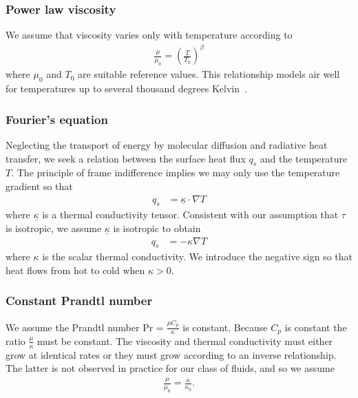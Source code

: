 \documentclass[letterpaper,11pt,nointlimits,reqno]{amsart}
\newcommand{\Prandtl}[1][]{\ensuremath{\mbox{Pr}_{#1}}}
\begin{document}
\subsubsection{Power law viscosity}

We assume that viscosity varies only with temperature according to
\begin{align}
\label{eq:powerlawviscosity}
\frac{\mu}{\mu_{0}}=\left(\frac{T}{T_{0}}\right)^{\beta}
\end{align}
where $\mu_{0}$ and $T_{0}$ are suitable reference values.  This
relationship models air well for temperatures up to several thousand
degrees Kelvin~\cite{NASA-TR-R-132}.

\subsubsection{Fourier's equation}

Neglecting the transport of energy by molecular diffusion and radiative
heat transfer, we seek a relation between the surface heat flux $q_{s}$
and the temperature $T$.  The principle of frame indifference implies
we may only use the temperature gradient so that
\begin{align}
  \label{eq:fouriertensorlaw}
  q_{s} &= \underline{\kappa} \cdot \nabla{} T
\end{align}
where $\underline{\kappa}$ is a thermal conductivity tensor.
Consistent with our assumption that $\tau$ is isotropic, we assume
$\underline{\kappa}$ is isotropic to obtain
\begin{align}
  \label{eq:fourierlaw}
  q_{s} &= - \kappa \nabla{} T
\end{align}
where $\kappa$ is the scalar thermal conductivity.  We introduce the
negative sign so that heat flows from hot to cold when $\kappa>0$.

\subsubsection{Constant Prandtl number}

We assume the Prandtl number $\Prandtl = \frac{\mu{}C_{p}}{\kappa}$ is constant.
Because $C_{p}$ is constant the ratio $\frac{\mu}{\kappa}$ must be
constant.  The viscosity and thermal conductivity must either grow at
identical rates or they must grow according to an inverse relationship.
The latter is not observed in practice for our class of fluids, and
so we assume
\begin{align}
  \frac{\mu}{\mu_{0}} = \frac{\kappa}{\kappa_{0}}
  .
  \label{eq:mukappa}
\end{align}
\end{document}
